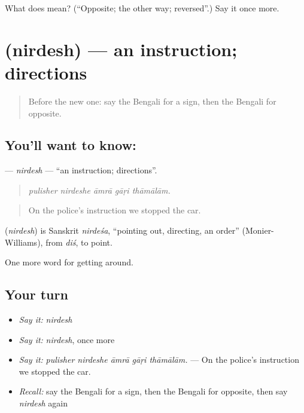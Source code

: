 \begin{tcolorbox}[breakable,colback=teal!4,colframe=teal!35!black,title={Before you move on}]
What does  mean? (\textquotedblleft{}Opposite; the other way; reversed\textquotedblright{}.) Say it once more.
\end{tcolorbox}
\section[\texorpdfstring{\bn{নির্দেশ} (nirdesh)}{নির্দেশ (nirdesh)}]{ (nirdesh) — an instruction; directions}

\label{lesson:BN-C400-nirdesh}



\begin{quote}
Before the new one: say the Bengali for a sign, then the Bengali for opposite.
\end{quote}

\subsection*{You'll want to know: }
\textbf{} — \emph{nirdesh} — \textquotedblleft{}an instruction; directions\textquotedblright{}.

\begin{quote}
    
\end{quote}

\begin{quote}
\emph{pulisher nirdeshe āmrā gāṛi thāmālām.}
\end{quote}

\begin{quote}
On the police's instruction we stopped the car.
\end{quote}

\begin{cousinweb}
\textbf{} (\emph{nirdesh}) is Sanskrit \emph{nirdeśa}, \textquotedblleft{}pointing out, directing, an order\textquotedblright{} (Monier-Williams), from \emph{diś}, to point.
\end{cousinweb}

\begin{grammarlens}[title={What you've built}]
One more word for getting around.
\end{grammarlens}

\subsection*{Your turn}
\begin{itemize}
\raggedright
  \item \emph{Say it:} \emph{nirdesh}
  \item \emph{Say it:} \emph{nirdesh}, once more
  \item \emph{Say it:} \emph{pulisher nirdeshe āmrā gāṛi thāmālām.} — On the police's instruction we stopped the car.
  \item \emph{Recall:} say the Bengali for a sign, then the Bengali for opposite, then say \emph{nirdesh} again
\end{itemize}

